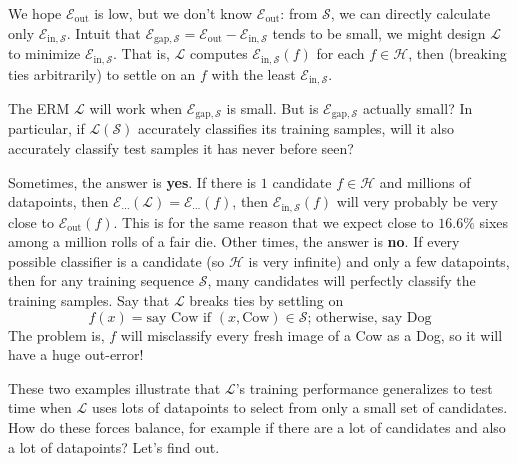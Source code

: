 \documentclass{article}
\newcommand{\Ee}{\mathcal{E}}
\newcommand{\Hh}{\mathcal{H}}
\newcommand{\Ll}{\mathcal{L}}
\newcommand{\Ss}{\mathcal{S}}
\begin{document}
            We hope $\Ee_{\text{out}}$ is low, but we don't know
            $\Ee_{\text{out}}$: from $\Ss$, we can directly calculate only
            $\Ee_{\text{in},\Ss}$.  Intuit that
            $ 
                \Ee_{\text{gap},\Ss} = \Ee_{\text{out}} - \Ee_{\text{in},\Ss}
            $ 
            tends to be small, we might design $\Ll$ to minimize $\Ee_{\text{in},\Ss}$.
            That is, $\Ll$ computes $\Ee_{\text{in},\Ss}(f)$ for
            each $f\in \Hh$, then (breaking ties arbitrarily) to settle on an
            $f$ with the least $\Ee_{\text{in},\Ss}$.
            
            The ERM $\Ll$ will work when $\Ee_{\text{gap},\Ss}$ is small.
            But is $\Ee_{\text{gap},\Ss}$ actually small?  In particular, if
            $\Ll(\Ss)$ accurately classifies its training samples, will it also
            accurately classify test samples it has never before seen?

            Sometimes, the answer is \textbf{yes}.
                If there is $1$ candidate $f\in \Hh$ and millions of
                datapoints, then $\Ee_{\cdots}(\Ll) = \Ee_{\cdots}(f)$, then
                $\Ee_{\text{in},\Ss}(f)$ will very probably be very close to
                $\Ee_{\text{out}}(f)$.  This is for the same reason that we
                expect close to $16.6\%$ sixes among a million rolls of a fair
                die. 
            Other times, the answer is \textbf{no}.
                If every possible classifier is a candidate (so $\Hh$ is very
                infinite) and only a few datapoints, then for any training
                sequence $\Ss$, many candidates will perfectly classify the
                training samples.  Say that $\Ll$ breaks ties 
                by settling on
                $$
                    f(x) = \text{say Cow if $(x,\text{Cow}) \in \Ss$;
                            otherwise, say Dog}
                $$
                The problem is, $f$ will misclassify every fresh image of a Cow
                as a Dog, so it will have a huge out-error!

            These two examples illustrate that $\Ll$'s training performance
            generalizes to test time when $\Ll$ uses lots of datapoints to
            select from only a small set of candidates.  
            How do these forces balance, for example if there are a lot of
            candidates and also a lot of datapoints?  Let's find out.
\end{document}
